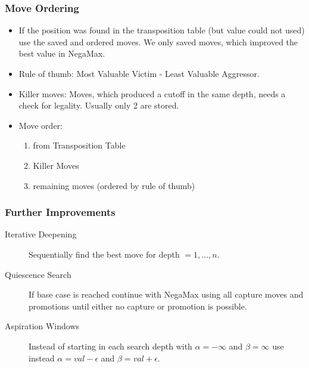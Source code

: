 \documentclass [12pt ,a4paper, british]{beamer}
\theoremstyle{plain}
\theoremstyle{definition}
\begin{document}
	\begin{frame}
	\frametitle{Move Ordering}
	\begin{itemize}
		\item If the position was found in the transposition table (but value could not used) use the saved and ordered moves. We only saved moves, which improved the best value in NegaMax.
		\item Rule of thumb: Most Valuable Victim - Least Valuable Aggressor.
		\item Killer moves: Moves, which produced a cutoff in the same depth, needs a check for legality. Usually only 2 are stored.
		\item Move order:
		\begin{enumerate}
			\item from Transposition Table
			\item Killer Moves
			\item remaining moves (ordered by rule of thumb)
		\end{enumerate}
		\end{itemize}
	\end{frame}
	
	\begin{frame}
	\frametitle{Further Improvements}
		\begin{description}
			\item[Iterative Deepening] Sequentially find the best move for depth $=1,\ldots,n$.  
			\item[Quiescence Search] If base case is reached continue with NegaMax using all capture moves and promotions until either no capture or promotion is possible.
			\item[Aspiration Windows] Instead of starting in each search depth with $\alpha = -\infty$ and $\beta = \infty$ use instead $\alpha = val-\epsilon$ and $\beta = val+\epsilon$.
		\end{description}
	\end{frame}
	
	
\end{document}
